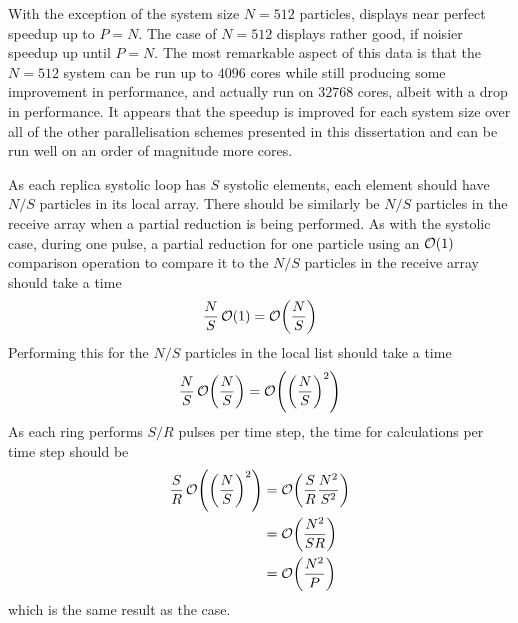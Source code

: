 \vZeroSpeedupExplanation
    {}
    {\replicatedsystolicloop{}}
    {\pairoperation{}}


%
With the exception of the system size $N = 512$ particles,
displays near perfect speedup up to $P = N$.
%
The case of $N = 512$ displays rather good, if noisier speedup up
until $P = N$.
%
The most remarkable aspect of this data is that the $N = 512$ system can
be run up to $4096$ cores while still producing some
improvement in performance,
and actually run on $32768$ cores, albeit with a drop
in performance.
%
It appears that the speedup is improved for each system size over all of
the other parallelisation schemes presented in this dissertation
and can be run well on an order of magnitude more cores.

%
As each replica systolic loop has $S$ systolic elements, each element
should have $N/S$ particles in its local array.
%
There should be similarly be $N/S$ particles in the receive array when
a partial reduction is being performed.
%
As with the systolic case, during one pulse, a partial reduction for one
particle using an $\mathcal{O}{\left({ 1 }\right)}$ comparison operation to compare it to the
$N/S$ particles in the receive array should take a time
\begin{equation}
    \frac{N}{S}\,\mathcal{O}{\left({ 1 }\right)} = \mathcal{O}{\left({ \frac{N}{S} }\right)}
\end{equation}
%
Performing this for the $N/S$ particles in the local list should take a time
\begin{equation}
    \frac{N}{S}\,\mathcal{O}{\left({ \frac{N}{S} }\right)} = \mathcal{O}{\left({ \left( \frac{N}{S} \right)^2 }\right)}
\end{equation}
%
As each ring performs $S/R$ pulses per time step, the time for calculations
per time step should be
\begin{equation}
    \label{eqn:replicated_systolic_pair_operation_calculation_time}
    \begin{split}
        \frac{S}{R}\,\mathcal{O}{\left({ \left( \frac{N}{S} \right)^2 }\right)}
            &= \mathcal{O}{\left({ \frac{S}{R} \frac{N^2}{S^2} }\right)} \\
            &= \mathcal{O}{\left({ \frac{N^2}{SR} }\right)} \\
            &= \mathcal{O}{\left({ \frac{N^2}{P} }\right)}
    \end{split}
\end{equation}
which is the same result as the \systolicloop{} case.


